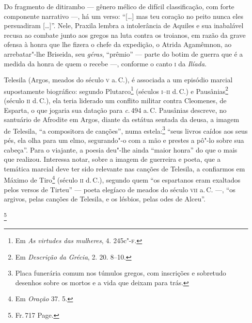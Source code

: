 Do fragmento de ditirambo --- gênero mélico de difícil classificação, com forte
componente narrativo ---, há um verso: ``{[}\ldots{}{]} mas teu coração no peito nunca
eles persuadiram {[}\ldots{}{]}”. Nele, Praxila lembra a intolerância de Aquiles e sua
inabalável recusa ao combate junto aos gregos na luta contra os troianos, em razão da
grave ofensa à honra que lhe fizera o chefe da expedição, o Atrida
Agamêmnon, ao arrebatar"-lhe Briseida, seu \emph{géras}, “prêmio” --- parte do
botim de guerra que é a medida da honra de quem o recebe ---, conforme o canto \textsc{i}
da \emph{Ilíada}.

Telesila (Argos, meados do século \textsc{v} a.\,C.), é associada a um episódio marcial
supostamente biográfico: segundo Plutarco\footnote{Em \emph{As
virtudes das mulheres}, 4. 245c"-\textsc{f}.} (séculos \textsc{i}--\textsc{ii} d.\,C.) e Pausânias\footnote{Em 
\emph{Descrição da Grécia}, 2. 20. 8--10.} (século \textsc{ii} d.\,C.), ela teria liderado um conflito
militar contra Cleomenes, de Esparta, o que jogaria sua datação para \emph{c.}\,494 a.\,C. Pausânias descreve, no santuário de Afrodite em Argos, diante da
estátua sentada da deusa, a imagem de Telesila, ``a compositora de
canções”, numa estela:\footnote{ Placa funerária comum nos túmulos gregos, com
inscrições e sobretudo desenhos sobre os mortos e a vida que deixam para trás.} ``seus livros caídos aos seus
pés, ela olha para um elmo, segurando"-o com a mão e prestes a pô"-lo sobre sua
cabeça”. Para o viajante, a poesia deu"-lhe ainda ``maior honra” do
que o mais que realizou. Interessa notar, sobre a imagem de guerreira e poeta,
que a temática marcial deve ter sido relevante nas canções de Telesila, a
confiarmos em Máximo de Tiro\footnote{Em \emph{Oração} 37. 5.} (século \textsc{ii} d.\,C.), segundo
quem ``os espartanos eram exaltados pelos versos de Tirteu” --- 
poeta elegíaco de meados do século \textsc{vii} a.\,C. ---, ``os argivos, pelas
canções de Telesila, e os lésbios, pelas odes de Alceu”. 

\footnote{Fr.\,717 Page.} 

